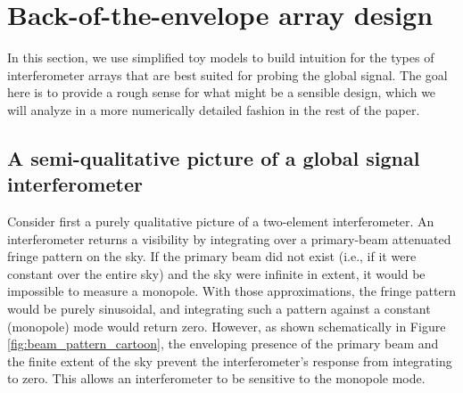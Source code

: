 \documentclass[twocolumn,apj,numberedappendix]{emulateapj}
\newcommand{\acl}[1]{}
\begin{document}
%

\section{Back-of-the-envelope array design}
\label{sec:BackOfEnvelopeArrayDesign}

In this section, we use simplified toy models to build intuition for the types of interferometer arrays that are best suited for probing the global signal.  The goal here is to provide a rough sense for what might be a sensible design, which we will analyze in a more numerically detailed fashion in the rest of the paper.

\subsection{A semi-qualitative picture of a global signal interferometer}
\label{sec:PictorialToyIntro}
Consider first a purely qualitative picture of a two-element interferometer. An interferometer returns a visibility by integrating over a primary-beam attenuated fringe pattern on the sky. If the primary beam did not exist (i.e., if it were constant over the entire sky) and the sky were infinite in extent, it would be impossible to measure a monopole. With those approximations, the fringe pattern would be purely sinusoidal, and integrating such a pattern against a constant (monopole) mode would return zero. However, as shown schematically in Figure \ref{fig:beam_pattern_cartoon}, the enveloping presence of the primary beam and the finite extent of the sky prevent the interferometer's response from integrating to zero. This allows an interferometer to be sensitive to the monopole mode.
\end{document}
